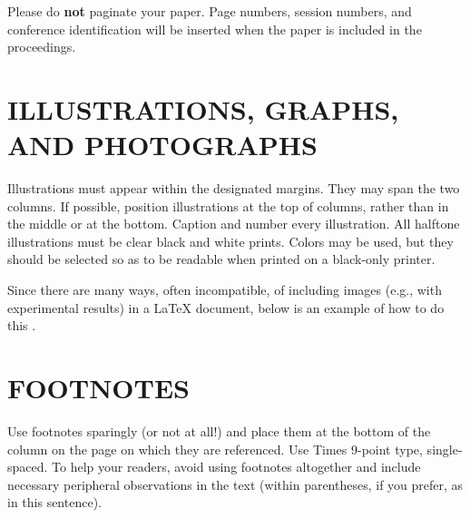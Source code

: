 \documentclass{article}
\begin{document}
Please do {\bf not} paginate your paper.  Page numbers, session numbers, and
conference identification will be inserted when the paper is included in the
proceedings.

\section{ILLUSTRATIONS, GRAPHS, AND PHOTOGRAPHS}
\label{sec:illust}

Illustrations must appear within the designated margins.  They may span the two
columns.  If possible, position illustrations at the top of columns, rather
than in the middle or at the bottom.  Caption and number every illustration.
All halftone illustrations must be clear black and white prints.  Colors may be
used, but they should be selected so as to be readable when printed on a
black-only printer.

Since there are many ways, often incompatible, of including images (e.g., with
experimental results) in a LaTeX document, below is an example of how to do
this \cite{Lamp86}.

\section{FOOTNOTES}
\label{sec:foot}

Use footnotes sparingly (or not at all!) and place them at the bottom of the
column on the page on which they are referenced. Use Times 9-point type,
single-spaced. To help your readers, avoid using footnotes altogether and
include necessary peripheral observations in the text (within parentheses, if
you prefer, as in this sentence).
\end{document}
